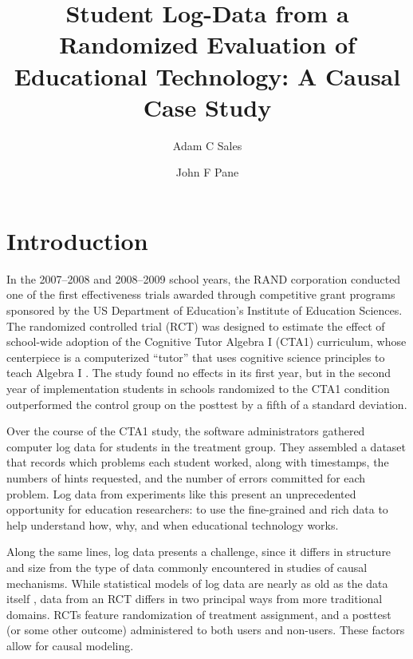 \documentclass{article}\usepackage[]{graphicx}\usepackage[]{color}
\title{Student Log-Data from a Randomized Evaluation of Educational
  Technology: A Causal Case Study}
\author[1]{Adam C Sales}
\author[2]{John F Pane}
\affil[1]{University of Texas, Austin, TX}
\affil[2]{RAND Corporation, Pittsburgh, PA}
\begin{document}
\maketitle

\section{Introduction}
In the 2007--2008 and 2008--2009 school years, the RAND corporation
conducted one of the first effectiveness trials awarded through
competitive grant programs sponsored by the US Department of
Education's Institute of Education Sciences.  The randomized
controlled trial (RCT) was
designed to estimate the effect of school-wide adoption of the
Cognitive Tutor Algebra I (CTA1) curriculum, whose centerpiece is a
computerized ``tutor'' that uses cognitive science principles to teach
Algebra I \citep{anderson1985intelligent}.
The study \citep{pane2014effectiveness} found no effects in its first year, but in
the second year of implementation students in schools randomized to
the CTA1 condition outperformed the control group on the posttest by a fifth of a
standard deviation.

Over the course of the CTA1 study, the software administrators
gathered computer log data for students in the treatment group.
They assembled a dataset that records which problems each student
worked, along with timestamps, the numbers of hints requested, and the
number of errors committed for each problem.
Log data from experiments like this present an unprecedented
opportunity for education researchers:
to use the fine-grained and rich data to
help understand how, why, and when educational technology works.

Along the same lines, log data presents a challenge, since it differs in
structure and size from the type of data commonly encountered in
studies of causal mechanisms.
While statistical models of log data are nearly as old as the data itself
\citep[e.g.][]{corbett1994knowledge}, data from an RCT differs in
two principal ways from more traditional domains.
RCTs feature randomization of treatment assignment, and a posttest
(or some other outcome) administered to both users and non-users.
These factors allow for causal modeling.
\end{document}
